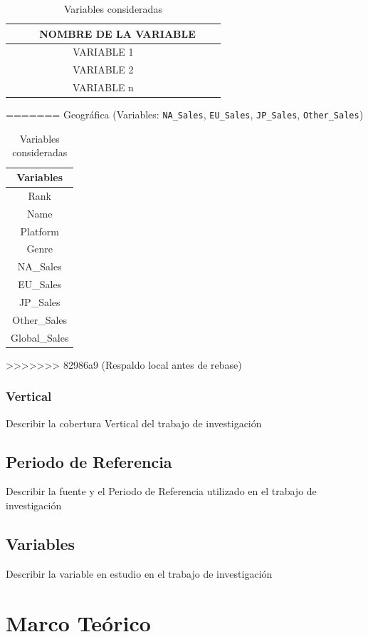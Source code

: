 \documentclass[oneside,11pt]{Latex/Classes/PhDthesisPSnPDF}
\begin{document}
\begin{table}[ht]
\centering
\caption{Variables consideradas} 
\resizebox{10cm}{!} {
\begin{tabular}{ccc}
  \hline
\ \ \ \ \ NOMBRE DE LA VARIABLE \\ 
  \hline
   VARIABLE 1 \\ 
VARIABLE 2\\ 
VARIABLE n\\ 
   \hline
\end{tabular}
}
=======
Geográfica (Variables: \texttt{NA\_Sales}, \texttt{EU\_Sales},
\texttt{JP\_Sales}, \texttt{Other\_Sales})

\begin{table}[H]
\centering
\caption{Variables consideradas}
\small %
\begin{tabular}{c}
\hline
\textbf{Variables} \\
\hline
Rank \\
Name \\
Platform \\
Genre \\
NA\_Sales \\
EU\_Sales \\
JP\_Sales \\
Other\_Sales \\
Global\_Sales \\
\hline
\end{tabular}
>>>>>>> 82986a9 (Respaldo local antes de rebase)
\end{table}

\subsection{Vertical}

Describir la cobertura Vertical del trabajo de investigación

\section{Periodo de Referencia}

Describir la fuente y el Periodo de Referencia utilizado en el trabajo
de investigación

\section{Variables}

Describir la variable en estudio en el trabajo de investigación

\chapter{Marco Teórico}


\end{table}
\end{document}
